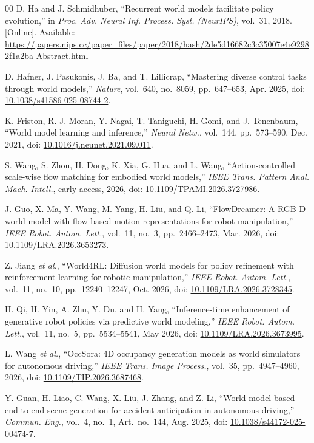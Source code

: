\documentclass[conference,a4paper]{IEEEtran}
\begin{document}
\begin{thebibliography}{00}
D. Ha and J. Schmidhuber, ``Recurrent world models facilitate policy evolution,'' in \emph{Proc. Adv. Neural Inf. Process. Syst. (NeurIPS)}, vol.~31, 2018. [Online]. Available: \url{https://papers.nips.cc/paper_files/paper/2018/hash/2de5d16682c3c35007e4e92982f1a2ba-Abstract.html}

D. Hafner, J. Pasukonis, J. Ba, and T. Lillicrap, ``Mastering diverse control tasks through world models,'' \emph{Nature}, vol.~640, no.~8059, pp.~647--653, Apr. 2025, doi: \url{10.1038/s41586-025-08744-2}.

K. Friston, R. J. Moran, Y. Nagai, T. Taniguchi, H. Gomi, and J. Tenenbaum, ``World model learning and inference,'' \emph{Neural Netw.}, vol.~144, pp.~573--590, Dec. 2021, doi: \url{10.1016/j.neunet.2021.09.011}.

S. Wang, S. Zhou, H. Dong, K. Xia, G. Hua, and L. Wang, ``Action-controlled scale-wise flow matching for embodied world models,'' \emph{IEEE Trans. Pattern Anal. Mach. Intell.}, early access, 2026, doi: \url{10.1109/TPAMI.2026.3727986}.

J. Guo, X. Ma, Y. Wang, M. Yang, H. Liu, and Q. Li, ``FlowDreamer: A RGB-D world model with flow-based motion representations for robot manipulation,'' \emph{IEEE Robot. Autom. Lett.}, vol.~11, no.~3, pp.~2466--2473, Mar. 2026, doi: \url{10.1109/LRA.2026.3653273}.

Z. Jiang \emph{et al.}, ``World4RL: Diffusion world models for policy refinement with reinforcement learning for robotic manipulation,'' \emph{IEEE Robot. Autom. Lett.}, vol.~11, no.~10, pp.~12240--12247, Oct. 2026, doi: \url{10.1109/LRA.2026.3728345}.

H. Qi, H. Yin, A. Zhu, Y. Du, and H. Yang, ``Inference-time enhancement of generative robot policies via predictive world modeling,'' \emph{IEEE Robot. Autom. Lett.}, vol.~11, no.~5, pp.~5534--5541, May 2026, doi: \url{10.1109/LRA.2026.3673995}.

L. Wang \emph{et al.}, ``OccSora: 4D occupancy generation models as world simulators for autonomous driving,'' \emph{IEEE Trans. Image Process.}, vol.~35, pp.~4947--4960, 2026, doi: \url{10.1109/TIP.2026.3687468}.

Y. Guan, H. Liao, C. Wang, X. Liu, J. Zhang, and Z. Li, ``World model-based end-to-end scene generation for accident anticipation in autonomous driving,'' \emph{Commun. Eng.}, vol.~4, no.~1, Art.~no.~144, Aug. 2025, doi: \url{10.1038/s44172-025-00474-7}.


\end{thebibliography}
\end{document}
